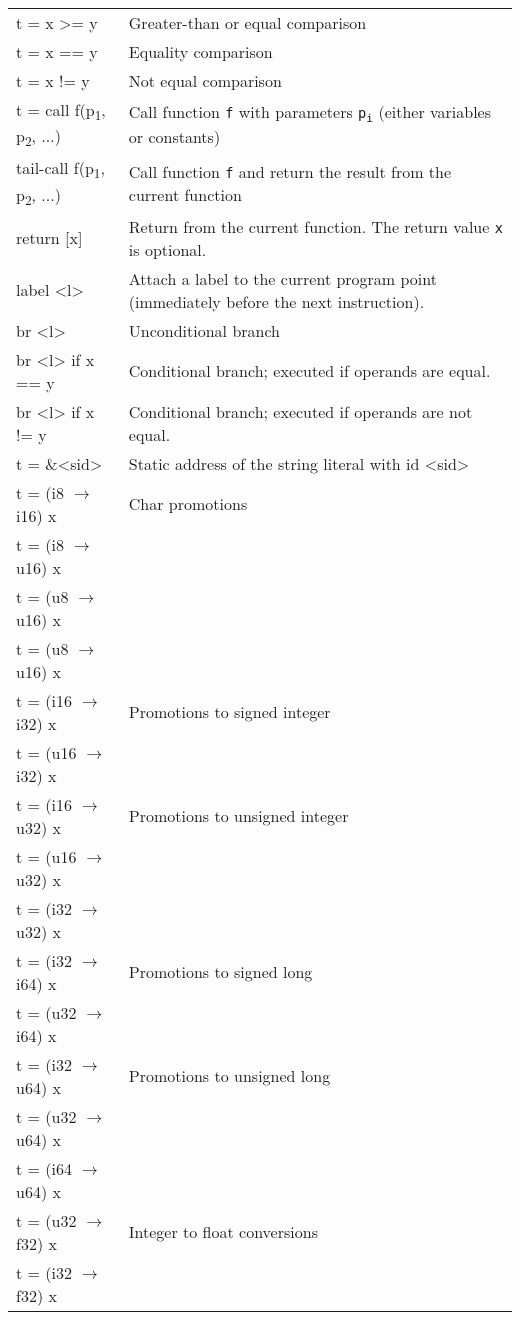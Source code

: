 \documentclass[../00-main.tex]{subfiles}
\begin{document}
\begin{xltabular}{\textwidth}{>{\ttfamily}lX}
t = x >= y & Greater-than or equal comparison \\
t = x == y & Equality comparison \\
t = x != y & Not equal comparison \\
\midrule
t = call f(p\textsubscript{1}, p\textsubscript{2}, ...) & Call function \texttt{f} with parameters \texttt{p\textsubscript{i}} (either variables or constants) \\
tail-call f(p\textsubscript{1}, p\textsubscript{2}, ...) & Call function \texttt{f} and return the result from the current function \\
return [x] & Return from the current function. The return value \texttt{x} is optional. \\
\midrule
label <l> & Attach a label to the current program point (immediately before the next instruction). \\
br <l> & Unconditional branch \\
br <l> if x == y & Conditional branch; executed if operands are equal. \\
br <l> if x != y & Conditional branch; executed if operands are not equal. \\
\midrule
t = \&<sid> & Static address of the string literal with id <sid> \\
\midrule
t = (i8 $\to$ i16) x & Char promotions \\
t = (i8 $\to$ u16) x &  \\
t = (u8 $\to$ u16) x &  \\
t = (u8 $\to$ u16) x &  \\
\midrule
t = (i16 $\to$ i32) x & Promotions to signed integer \\
t = (u16 $\to$ i32) x &  \\
\midrule
t = (i16 $\to$ u32) x & Promotions to unsigned integer \\
t = (u16 $\to$ u32) x &  \\
t = (i32 $\to$ u32) x &  \\
\midrule
t = (i32 $\to$ i64) x & Promotions to signed long \\
t = (u32 $\to$ i64) x &  \\
\midrule
t = (i32 $\to$ u64) x & Promotions to unsigned long \\
t = (u32 $\to$ u64) x &  \\
t = (i64 $\to$ u64) x &  \\
\midrule
t = (u32 $\to$ f32) x & Integer to float conversions \\
t = (i32 $\to$ f32) x & \\

\end{xltabular}
\end{document}
